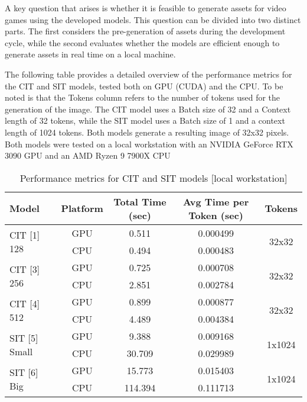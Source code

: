     A key question that arises is whether it is feasible to generate assets for video games using the developed models. This question can be divided into two distinct parts. The first considers the pre-generation of assets during the development cycle, while the second evaluates whether the models are efficient enough to generate assets in real time on a local machine.

    The following table provides a detailed overview of the performance metrics for the CIT and SIT models, tested both on GPU (CUDA) and the CPU. To be noted is that the Tokens column refers to the number of tokens used for the generation of the image. The CIT model uses a Batch size of 32 and a Context length of 32 tokens, while the SIT model uses a Batch size of 1 and a context length of 1024 tokens. Both models generate a resulting image of 32x32 pixels. Both models were tested on a local workstation with an NVIDIA GeForce RTX 3090 GPU and an AMD Ryzen 9 7900X CPU

    \begin{table}[H]
        \centering
        \small
        \begin{tabular}{|l|c|c|c|c|}
        \hline
        \textbf{Model} & \textbf{Platform} & \textbf{Total Time (sec)} & \textbf{Avg Time per Token (sec)} & \textbf{Tokens} \\ \hline
        \multirow{2}{*}{CIT [1] 128} & GPU & 0.511 & 0.000499 & \multirow{2}{*}{32x32} \\ \cline{2-4}
                                           & CPU  & 0.494 & 0.000483 &  \\ \hline
        \multirow{2}{*}{CIT [3] 256} & GPU & 0.725 & 0.000708 & \multirow{2}{*}{32x32} \\ \cline{2-4}
                                           & CPU  & 2.851 & 0.002784 &  \\ \hline
        \multirow{2}{*}{CIT [4] 512} & GPU & 0.899 & 0.000877 & \multirow{2}{*}{32x32} \\ \cline{2-4}
                                           & CPU  & 4.489 & 0.004384 &  \\ \hline
        \multirow{2}{*}{SIT [5] Small} & GPU & 9.388 & 0.009168 & \multirow{2}{*}{1x1024} \\ \cline{2-4}
                                             & CPU  & 30.709 & 0.029989 &  \\ \hline
        \multirow{2}{*}{SIT [6] Big} & GPU & 15.773 & 0.015403 & \multirow{2}{*}{1x1024} \\ \cline{2-4}
                                           & CPU  & 114.394 & 0.111713 &  \\ \hline
        \end{tabular}
        \caption{Performance metrics for CIT and SIT models [local workstation]}
        \label{tab:performance_metrics}
    \end{table}
        
